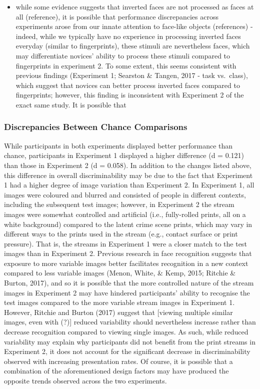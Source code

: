 \documentclass[
  english,
  man]{apa6}
\providecommand{\tightlist}{%
  \setlength{\itemsep}{0pt}\setlength{\parskip}{0pt}}
\begin{document}
\begin{itemize}
\tightlist
\item
  while some evidence suggests that inverted faces are not processed as faces at all (reference), it is possible that performance discrepancies across experiments arose from our innate attention to face-like objects (references) - indeed, while we typically have no experience in processing inverted faces everyday (similar to fingerprints), these stimuli are nevertheless faces, which may differentiate novices' ability to process these stimuli compared to fingerprints in experiment 2. To some extent, this seems consistent with previous findings (Experiment 1; Searston \& Tangen, 2017 - task vs.~class), which suggest that novices can better process inverted faces compared to fingerprints; however, this finding is inconsistent with Experiment 2 of the exact same study. It is possible that
\end{itemize}

\hypertarget{discrepancies-between-chance-comparisons}{%
\subsubsection{Discrepancies Between Chance Comparisons}\label{discrepancies-between-chance-comparisons}}

While participants in both experiments displayed better performance than chance, participants in Experiment 1 displayed a higher difference (d = 0.121) than those in Experiment 2 (d = 0.058). In addition to the changes listed above, this difference in overall discriminability may be due to the fact that Experiment 1 had a higher degree of image variation than Experiment 2. In Experiment 1, all images were coloured and blurred and consisted of people in different contexts, including the subsequent test images; however, in Experiment 2 the stream images were somewhat controlled and artificial (i.e., fully-rolled prints, all on a white background) compared to the latent crime scene prints, which may vary in different ways to the prints used in the stream (e.g., contact surface or print pressure). That is, the streams in Experiment 1 were a closer match to the test images than in Experiment 2. Previous research in face recognition suggests that exposure to more variable images better facilitates recognition in a new context compared to less variable images (Menon, White, \& Kemp, 2015; Ritchie \& Burton, 2017), and so it is possible that the more controlled nature of the stream images in Experiment 2 may have hindered participants' ability to recognise the test images compared to the more variable stream images in Experiment 1. However, Ritchie and Burton (2017) suggest that {[}viewing multiple similar images, even with (?){]} reduced variability should nevertheless increase rather than decrease recognition compared to viewing single images. As such, while reduced variability may explain why participants did not benefit from the print streams in Experiment 2, it does not account for the significant decrease in discriminability observed with increasing presentation rates. Of course, it is possible that a combination of the aforementioned design factors may have produced the opposite trends observed across the two experiments.
\end{document}
